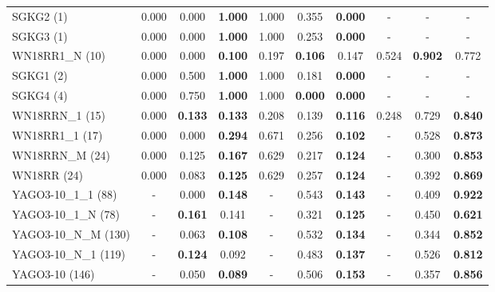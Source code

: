 \begin{table}[t]
{\begin{tabular}{l||ccc|ccc|ccc}
SGKG2 (1) & 0.000 & 0.000 & \textbf{1.000} & 1.000 & 0.355 & \textbf{0.000} & - & - & - \\
SGKG3 (1) & 0.000 & 0.000 & \textbf{1.000} & 1.000 & 0.253 & \textbf{0.000} & - & - & - \\
WN18RR1\_N (10) & 0.000 & 0.000 & \textbf{0.100} & 0.197 & \textbf{0.106} & 0.147 & 0.524 & \textbf{0.902} & 0.772 \\
SGKG1 (2) & 0.000 & 0.500 & \textbf{1.000} & 1.000 & 0.181 & \textbf{0.000} & - & - & - \\
SGKG4 (4) & 0.000 & 0.750 & \textbf{1.000} & 1.000 & \textbf{0.000} & \textbf{0.000} & - & - & - \\
WN18RRN\_1 (15) & 0.000 & \textbf{0.133} & \textbf{0.133} & 0.208 & 0.139 & \textbf{0.116} & 0.248 & 0.729 & \textbf{0.840} \\
WN18RR1\_1 (17) & 0.000 & 0.000 & \textbf{0.294} & 0.671 & 0.256 & \textbf{0.102} & - & 0.528 & \textbf{0.873} \\
WN18RRN\_M (24) & 0.000 & 0.125 & \textbf{0.167} & 0.629 & 0.217 & \textbf{0.124} & - & 0.300 & \textbf{0.853} \\
WN18RR (24) & 0.000 & 0.083 & \textbf{0.125} & 0.629 & 0.257 & \textbf{0.124} & - & 0.392 & \textbf{0.869} \\
YAGO3-10\_1\_1 (88) & - & 0.000 & \textbf{0.148} & - & 0.543 & \textbf{0.143} & - & 0.409 & \textbf{0.922} \\
YAGO3-10\_1\_N (78) & - & \textbf{0.161} & 0.141 & - & 0.321 & \textbf{0.125} & - & 0.450 & \textbf{0.621} \\
YAGO3-10\_N\_M (130) & - & 0.063 & \textbf{0.108} & - & 0.532 & \textbf{0.134} & - & 0.344 & \textbf{0.852} \\
YAGO3-10\_N\_1 (119) & - & \textbf{0.124} & 0.092 & - & 0.483 & \textbf{0.137} & - & 0.526 & \textbf{0.812} \\
YAGO3-10 (146) & - & 0.050 & \textbf{0.089} & - & 0.506 & \textbf{0.153} & - & 0.357 & \textbf{0.856} \\
\hline
\end{tabular}%
}
\end{table}
